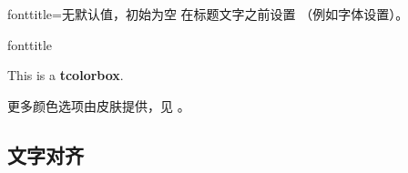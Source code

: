 \begin{docTcbKey}{fonttitle}{=}{无默认值，初始为空}
  在标题文字之前设置 （例如字体设置）。
\begin{exdispExample}{fonttitle}
\begin{tcolorbox}[fonttitle=\sffamily\bfseries\large,title=Hello]
This is a \textbf{tcolorbox}.
\end{tcolorbox}
\end{exdispExample}
\end{docTcbKey}

\bigskip
\begin{marker}
  更多颜色选项由皮肤提供，见 。
\end{marker}


\clearpage
\subsection{文字对齐}

